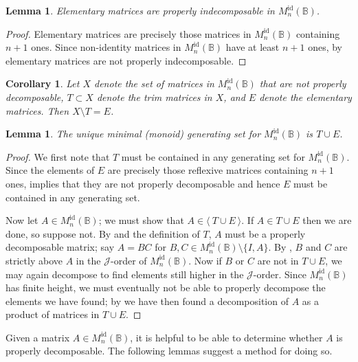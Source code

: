 \documentclass[11pt]{article}
\newtheorem{cor}[thm]{Corollary}
\newtheorem{lemma}[thm]{Lemma}
\numberwithin{equation}{section}
\newcommand{\genset}[1]{\ensuremath{\langle\: #1 \:\rangle}}
\newcommand{\B}{\mathbb{B}}
\newcommand{\Refn}{M_n^{\text{id}}(\B)}
\newcommand{\J}{\mathscr{J}}
\begin{document}
\begin{lemma}
  Elementary matrices are properly indecomposable in $\Refn$.
\end{lemma}
\begin{proof}
  Elementary matrices are precisely those matrices in $\Refn$ containing $n + 1$
  ones. Since non-identity matrices in $\Refn$ have at least $n + 1$ ones, by
   elementary matrices are not properly
  indecomposable.
\end{proof}

\begin{cor}
  Let $X$ denote the set of matrices in $\Refn$ that are not properly
  decomposable, $T \subset X$ denote the trim matrices in $X$, and $E$ denote
  the elementary matrices. Then $X \setminus T = E$. 
\end{cor}

\begin{lemma}
  The unique minimal (monoid) generating set for $\Refn$ is $T \cup E$.
\end{lemma}
\begin{proof}
  We first note that $T$ must be contained in any generating set for $\Refn$.
  Since the elements of $E$ are precisely those reflexive matrices containing
  $n + 1$ ones,  implies that they are not
  properly decomposable and hence $E$ must be contained in any generating set.

  Now let $A \in \Refn$; we must show that $A \in \genset{T \cup E}$. If $A \in
  T \cup E$ then we are done, so suppose not. By
   and the definition of $T$, $A$ must be a
  properly decomposable matrix; say $A = BC$ for $B, C \in \Refn\setminus\{I,
  A\}$. By , $B$ and $C$ are strictly above $A$ in
  the $\J$-order of $\Refn$. Now if $B$ or $C$ are not in $T \cup E$, we may
  again decompose to find elements still higher in the $\J$-order. Since $\Refn$
  has finite height, we must eventually not be able to properly decompose the
  elements we have found; by  we have then
  found a decomposition of $A$ as a product of matrices in $T \cup E$.
\end{proof}

Given a matrix $A \in \Refn$, it is helpful to be able to determine whether $A$
is properly decomposable. The following lemmas suggest a method for doing so.
\end{document}
